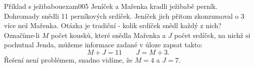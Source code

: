 \begin{mathexam}{Příklad s ježibabou}{exam005}
  Jeníček a Mařenka kradli ježibabě perník. Dohromady snědli \num{11} perníkových srdíček. Jeníček
  jich přitom zkonzumoval o \num{3} více než Mařenka. Otázka je tradiční - kolik srdíček snědl každý
  z nich? Označíme-li \(M\) počet kousků, které snědla Mařenka a \(J\) počet srdíček, na nichž si
  pochutnal Jenda, můžeme informace zadané v úloze zapsat takto:
  \begin{equation*}
    M + J = 11 \qquad J = M + 3.
  \end{equation*}
  Řešení není problémem, snadno vidíme, že \(M = 4\) a \(J = 7\).
\end{mathexam}